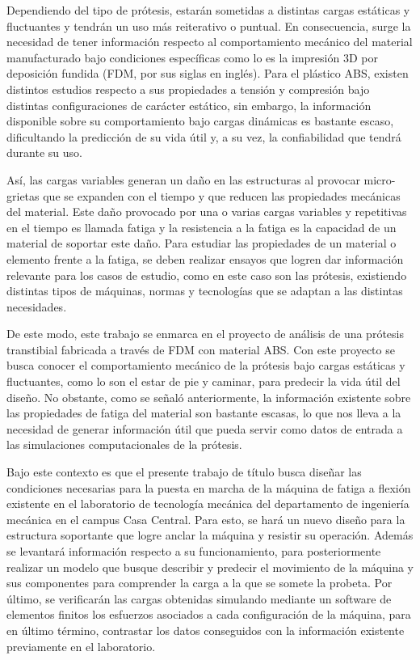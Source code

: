 Dependiendo del tipo de prótesis, estarán sometidas a distintas cargas estáticas y fluctuantes y tendrán un uso más reiterativo o puntual. En consecuencia, surge la necesidad de tener información respecto al comportamiento mecánico del material manufacturado bajo condiciones específicas como lo es la impresión 3D por deposición fundida (FDM, por sus siglas en inglés). Para el plástico ABS, existen distintos estudios respecto a sus propiedades a tensión y compresión bajo distintas configuraciones de carácter estático, sin embargo, la información disponible sobre su comportamiento bajo cargas dinámicas es bastante escaso, dificultando la predicción de su vida útil y, a su vez, la confiabilidad que tendrá durante su uso.

Así, las cargas variables generan un daño en las estructuras al provocar micro-grietas que se expanden con el tiempo y que reducen las propiedades mecánicas del material. Este daño provocado por una o varias cargas variables y repetitivas en el tiempo es llamada fatiga y la resistencia a la fatiga es la capacidad de un material de soportar este daño. Para estudiar las propiedades de un material o elemento frente a la fatiga, se deben realizar ensayos que logren dar información relevante para los casos de estudio, como en este caso son las prótesis, existiendo distintas tipos de máquinas, normas y tecnologías que se adaptan a las distintas necesidades.

De este modo, este trabajo se enmarca en el proyecto de análisis de una prótesis transtibial fabricada a través de FDM con material ABS. Con este proyecto se busca conocer el comportamiento mecánico de la prótesis bajo cargas estáticas y fluctuantes, como lo son el estar de pie y caminar, para predecir la vida útil del diseño. No obstante, como se señaló anteriormente, la información existente sobre las propiedades de fatiga del material son bastante escasas, lo que nos lleva a la necesidad de generar información útil que pueda servir como datos de entrada a las simulaciones computacionales de la prótesis.

Bajo este contexto es que el presente trabajo de título busca diseñar las condiciones necesarias para la puesta en marcha de la máquina de fatiga a flexión existente en el laboratorio de tecnología mecánica del departamento de ingeniería mecánica en el campus Casa Central. Para esto, se hará un nuevo diseño para la estructura soportante que logre anclar la máquina y resistir su operación. Además se levantará información respecto a su funcionamiento, para posteriormente realizar un modelo que busque describir y predecir el movimiento de la máquina y sus componentes para comprender la carga a la que se somete la probeta. Por último, se verificarán las cargas obtenidas simulando mediante un software de elementos finitos los esfuerzos asociados a cada configuración de la máquina, para en último término, contrastar los datos conseguidos con la información existente previamente en el laboratorio.

